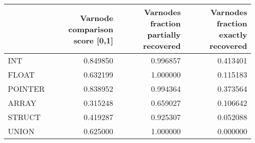 \begin{tabular}{lrrr}
\toprule
{} &  Varnode comparison score [0,1] &  Varnodes fraction partially recovered &  Varnodes fraction exactly recovered \\
\midrule
INT     &                        0.849850 &                               0.996857 &                             0.413401 \\
FLOAT   &                        0.632199 &                               1.000000 &                             0.115183 \\
POINTER &                        0.838952 &                               0.994364 &                             0.373564 \\
ARRAY   &                        0.315248 &                               0.659027 &                             0.106642 \\
STRUCT  &                        0.419287 &                               0.925307 &                             0.052088 \\
UNION   &                        0.625000 &                               1.000000 &                             0.000000 \\
\bottomrule
\end{tabular}
